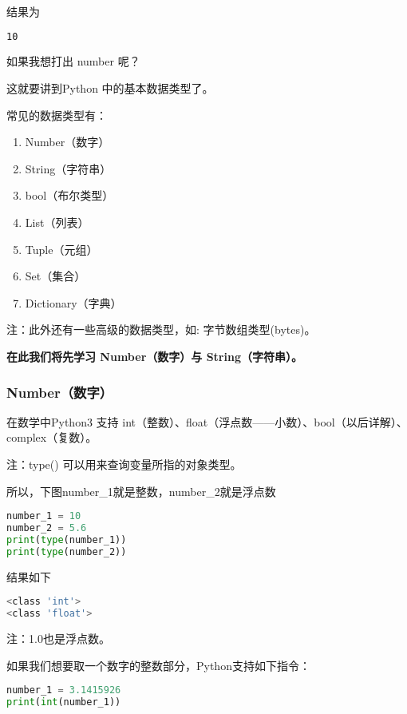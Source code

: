 结果为

\begin{lstlisting}[language=bash]
10
\end{lstlisting}

如果我想打出 number 呢？

这就要讲到Python 中的基本数据类型了。

常见的数据类型有：

\begin{enumerate}
\item Number（数字）
\item String（字符串）
\item bool（布尔类型）
\item List（列表）
\item Tuple（元组）
\item Set（集合）
\item Dictionary（字典）
\end{enumerate}

注：此外还有一些高级的数据类型，如: 字节数组类型(bytes)。

\textbf{在此我们将先学习 Number（数字）与 String（字符串）。}

\subsubsection{Number（数字）}

在数学中Python3 支持 int（整数）、float（浮点数——小数）、bool（以后详解）、complex（复数）。

注：type() 可以用来查询变量所指的对象类型。

所以，下图number_1就是整数，number_2就是浮点数

\begin{lstlisting}[language=python]
number_1 = 10 
number_2 = 5.6
print(type(number_1))
print(type(number_2))
\end{lstlisting}

结果如下

\begin{lstlisting}[language=bash]
<class 'int'>
<class 'float'>
\end{lstlisting}

注：1.0也是浮点数。

如果我们想要取一个数字的整数部分，Python支持如下指令：

\begin{lstlisting}[language=python]
number_1 = 3.1415926
print(int(number_1))
\end{lstlisting}

